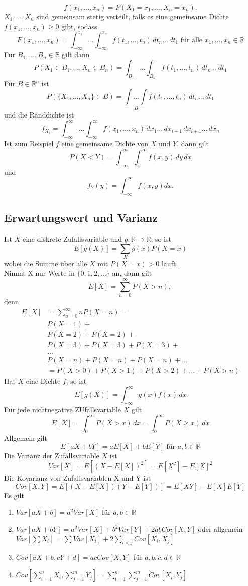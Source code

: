 \documentclass[a4paper,12pt]{article}
\begin{document}
$$
f(x_1, ..., x_n) = P(X_1=x_1, ..., X_n=x_n)
.$$
$X_1, ..., X_n$ sind gemeinsam stetig verteilt, falls es eine gemeinsame Dichte $f(x_1, ...,x_n) \geq 0$ gibt, sodass
$$
F(x_1, ..., x_n) = \int_{-\infty}^{x_1} \dots \int_{-\infty}^{x_n}f(t_1, ..., t_n) \,dt_n \dots \,dt_1 \text{ für alle } x_1, ..., x_n \in \mathbb{R}
$$
Für $B_1, ..., B_n \in \mathbb{R}$ gilt dann
$$
P(X_1 \in B_1, ..., X_n \in B_n) = \int_{B_1} ... \int_{B_n} f(t_1, ..., t_n) \, dt_n ... \, dt_1
$$
Für $B \in \mathbb{R}^n$ ist
$$
P \left(  \{X_1, ..., X_n\} \in B   \right) = \underset{B}{\int \dots \int} f(t_1, ..., t_n) \, dt_n ... \, dt_1
$$
und die Randdichte ist 
$$
f_{X_i} = \int_{-\infty}^{\infty} ...\int_{-\infty}^{\infty} f(x_1, ..., x_n) \,dx_1 ... \, dx_{i-1} \, dx_{i+1} ... \, dx_n
$$
Ist zum Beispiel $f$ eine gemeinsame Dichte von $X$ und $Y$, dann gilt
$$
P(X < Y) = \int_{-\infty}^{\infty} \int_{x}^{\infty} f(x,y) \, dy \, dx
$$
und
$$
f_Y(y) = \int_{-\infty}^{\infty} f(x,y) dx
.$$

\subsection{Erwartungswert und Varianz}
Ist $X$ eine diskrete Zufallsvariable und $g: \mathbb{R} \to \mathbb{R}$, so ist 
$$
E[g(X)] = \sum_{X} g(x)P(X=x)
$$
wobei die Summe über alle $X$ mit $P(X=x) > 0$ läuft.\\
Nimmt X nur Werte in $\{ 0, 1, 2, ...    \}$ an, dann gilt
$$
E[X] = \sum_{n=0}^{\infty}P(X>n) \text{, }
$$
denn
\begin{align*}
	E[X] &= \sum_{n=0}^{\infty} n P(X=n) = \\
	& P(X=1) + \\
	& P(X=2) + P(X=2) + \\
	& P(X=3) + P(X=3) + P(X=3) + \\
	& \dots \\
	& P(X=n) + P(X=n) + P(X=n) + \dots \\
	&= P(X>0) + P(X > 1) + P(X>2) + \dots + P(X>n)
\end{align*}
Hat $X$ eine Dichte $f$, so ist
$$
E[g(X)] = \int_{-\infty}^{\infty}g(x)f(x) \,dx
$$
Für jede nichtnegative ZUfallsvariable $X$ gilt
$$
E[X] = \int_{0}^{\infty}P(X>x) \, dx = \int_{0}^{\infty}P( X\geq x) \, dx
$$
Allgemein gilt
$$
E[aX + bY] = aE[X] + bE[Y] \text{ für } a,b \in \mathbb{R}
$$
Die Varianz der Zufallsvariable $X$ ist
$$
Var[X] = E \left[ (X- E[X])^2     \right] = E\left[ X^2 \right] - E[X]^2
$$
Die Kovarianz von Zufallsvariablen X und Y ist
$$
Cov[X,Y] = E \left[ (X-E[X])(Y-E[Y])    \right] = E[XY] - E[X]E[Y]
$$
Es gilt
\begin{enumerate}
	\item $Var[aX + b] = a^2Var[X]$ für $a,b \in \mathbb{R}$
	\item $Var[aX + bY] = a^2Var[X] + b^2Var[Y] + 2abCov[X,Y]     $ oder allgemein $Var \left[ \sum X_i \right] = \sum Var[X_i] + 2 \sum_{i<j}Cov[X_i,X_j]$
	\item $Cov[aX + b, cY + d] = acCov[X,Y]$ für $a,b,c,d \in \mathbb{R}$
	\item $Cov \left[\sum_{i=1}^{n}X_i, \sum_{j=1}^{m}Y_j      \right] = \sum_{i=1}^{n}\sum_{j=1}^{m}Cov[X_i,Y_j]$
\end{enumerate}
\end{document}
